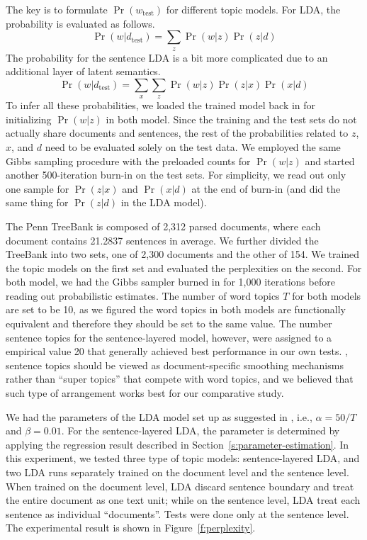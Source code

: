 The key is to formulate $\Pr(w_\mathrm{test})$ for different topic models.  For
LDA, the probability is evaluated as follows.  \[ \Pr(w|d_\mathrm{test}) =
\sum_z \Pr(w|z) \Pr(z|d) \] The probability for the sentence LDA is a
bit more complicated due to an additional layer of latent semantics.  \[
\Pr(w|d_\mathrm{test}) = \sum_x \sum_z \Pr(w|z) \Pr(z|x) \Pr(x|d) \]
To infer all these probabilities, we loaded the trained model back in for
initializing $\Pr(w|z)$ in both model.  Since the training and the test sets do
not actually share documents and sentences, the rest of the probabilities
related to $z$, $x$, and $d$ need to be evaluated solely on the test data.  We
employed the same Gibbs sampling procedure with the preloaded counts for
$\Pr(w|z)$ and started another 500-iteration burn-in on the test sets.  For
simplicity, we read out only one sample for $\Pr(z|x)$ and $\Pr(x|d)$ at the
end of burn-in (and did the same thing for $\Pr(z|d)$ in the LDA model).

The Penn TreeBank is composed of 2,312 parsed documents, where each document
contains 21.2837 sentences in average.  We further divided the TreeBank into
two sets, one of 2,300 documents and the other of 154.  We trained the topic
models on the first set and evaluated the perplexities on the second.  For both
model, we had the Gibbs sampler burned in for 1,000 iterations before reading
out probabilistic estimates.  The number of word topics $T$ for both models are
set to be 10, as we figured the word topics in both models are functionally
equivalent and therefore they should be set to the same value.  The number
sentence topics for the sentence-layered model, however, were assigned to a
empirical value 20 that generally achieved best performance in our own tests.
, sentence topics should be viewed as
document-specific smoothing mechanisms rather than ``super topics'' that
compete with word topics, and we believed that such type of arrangement works
best for our comparative study. 

We had the parameters of the LDA model set up as suggested in
\cite{griffiths2004finding}, i.e., $\alpha = 50 / T$ and $\beta = 0.01$.  For
the sentence-layered LDA, the parameter is determined by applying the
regression result described in Section~\ref{s:parameter-estimation}.  In this
experiment, we tested three type of topic models: sentence-layered LDA, and two
LDA runs separately trained on the document level and the sentence level.  When
trained on the document level, LDA discard sentence boundary and treat the
entire document as one text unit; while on the sentence level, LDA treat each
sentence as individual ``documents''.  Tests were done only at the sentence
level.  The experimental result is shown in Figure~\ref{f:perplexity}.

